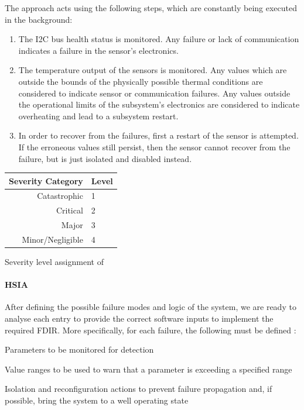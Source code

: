 \documentclass[a4paper,nobib,final]{tufte-book}
\begin{document}
The approach acts using the following steps, which are constantly being executed in the background:
\begin{enumerate}
	\item The \ac{I2C} bus health status is monitored. Any failure or lack of communication indicates a failure in the sensor's electronics.
	\item The temperature output of the sensors is monitored. Any values which are outside the bounds of the physically possible thermal conditions are considered to indicate sensor or communication failures. Any values outside the operational limits of the subsystem's electronics are considered to indicate overheating and lead to a subsystem restart.
	\item In order to recover from the failures, first a restart of the sensor is attempted. If the erroneous values still persist, then the sensor cannot recover from the failure, but is just isolated and disabled instead.
\end{enumerate}

\begin{margintable}
	\begin{tabularx}{\linewidth}{@{}rX@{}}
		\toprule
		Severity Category & Level\\ \midrule
		Catastrophic & 1 \\
		Critical & 2 \\
		Major & 3 \\
		Minor/Negligible & 4 \\ \bottomrule
	\end{tabularx}
	\caption{Severity level assignment of }
\end{margintable}

\clearpage
\paragraph{\acl{HSIA}}

After defining the possible failure modes and logic of the system, we are ready to analyse each entry to provide the correct software inputs to implement the required \ac{FDIR}. More specifically, for each failure, the following must be defined \autocite[84]{SAVOIR-HB-003}:
\begin{compactitem}
	\item Parameters to be monitored for detection
	\item Value ranges to be used to warn that a parameter is exceeding a specified range
	\item Isolation and reconfiguration actions to prevent failure propagation and, if possible, bring the system to a well operating state
\end{compactitem}
\end{document}
